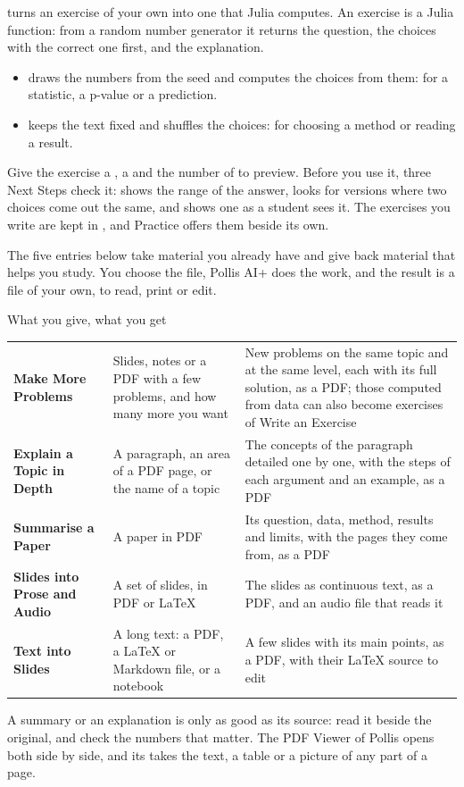  turns an exercise of your own into one that Julia computes. An exercise is a Julia
function: from a random number generator it returns the question, the choices with the correct one first,
and the explanation.
\begin{itemize}
  \item {} draws the numbers from the seed and computes the choices from them: for a
    statistic, a p-value or a prediction.
  \item {} keeps the text fixed and shuffles the choices: for choosing a method or reading a
    result.
\end{itemize}
Give the exercise a , a  and the number of  to preview.
Before you use it, three Next Steps check it:  shows the range of
the answer,  looks for versions where two choices come out the same, and
 shows one as a student sees it. The exercises you write are kept in
, and Practice offers them beside its own.

The five entries below take material you already have and give back material that helps you study. You
choose the file, Pollis AI+ does the work, and the result is a file of your own, to read, print or edit.
\begin{pbox}{What you give, what you get}
\begin{tabularx}{\linewidth}{@{}>{\raggedright\arraybackslash\bfseries}p{36mm}>{\raggedright\arraybackslash}p{46mm}X@{}}
Make More Problems & Slides, notes or a PDF with a few problems, and how many more you want & New problems on the same topic and at the same level, each with its full solution, as a PDF; those computed from data can also become exercises of Write an Exercise \\[3pt]
Explain a Topic in Depth & A paragraph, an area of a PDF page, or the name of a topic & The concepts of the paragraph detailed one by one, with the steps of each argument and an example, as a PDF \\[3pt]
Summarise a Paper & A paper in PDF & Its question, data, method, results and limits, with the pages they come from, as a PDF \\[3pt]
Slides into Prose and Audio & A set of slides, in PDF or LaTeX & The slides as continuous text, as a PDF, and an audio file that reads it \\[3pt]
Text into Slides & A long text: a PDF, a LaTeX or Markdown file, or a notebook & A few slides with its main points, as a PDF, with their LaTeX source to edit
\end{tabularx}
\end{pbox}
A summary or an explanation is only as good as its source: read it beside the original, and check the
numbers that matter. The PDF Viewer of Pollis opens both side by side, and its  takes
the text, a table or a picture of any part of a page.

